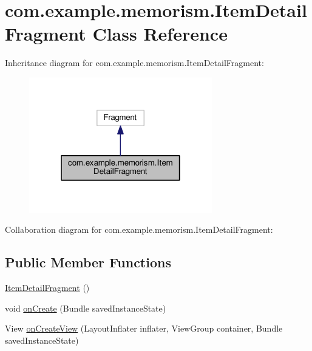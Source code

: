 \hypertarget{classcom_1_1example_1_1memorism_1_1_item_detail_fragment}{}\section{com.\+example.\+memorism.\+Item\+Detail\+Fragment Class Reference}
\label{classcom_1_1example_1_1memorism_1_1_item_detail_fragment}


Inheritance diagram for com.\+example.\+memorism.\+Item\+Detail\+Fragment\+:\nopagebreak
\begin{figure}[H]
\begin{center}
\leavevmode
\includegraphics[width=226pt]{d1/db4/classcom_1_1example_1_1memorism_1_1_item_detail_fragment__inherit__graph}
\end{center}
\end{figure}


Collaboration diagram for com.\+example.\+memorism.\+Item\+Detail\+Fragment\+:
\subsection*{Public Member Functions}
\begin{DoxyCompactItemize}
\item 
\hyperlink{classcom_1_1example_1_1memorism_1_1_item_detail_fragment_abe2ebd5db13c9ea5fae5fc6aef4fd1f0}{Item\+Detail\+Fragment} ()
\item 
void \hyperlink{classcom_1_1example_1_1memorism_1_1_item_detail_fragment_ad7e424057935edb269914905533dc75b}{on\+Create} (Bundle saved\+Instance\+State)
\item 
View \hyperlink{classcom_1_1example_1_1memorism_1_1_item_detail_fragment_a7344c27a8c7f8fdafd6d91bb0a6d1b2b}{on\+Create\+View} (Layout\+Inflater inflater, View\+Group container, Bundle saved\+Instance\+State)
\end{DoxyCompactItemize}
